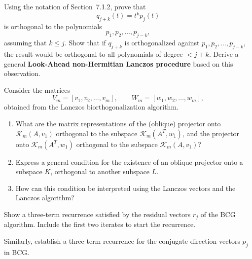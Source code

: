 \documentclass{ctexart}
\newif\ifpreface
\begin{document}
\large
\setlength{\baselineskip}{1.2em}
\ifpreface
    
\newgeometry{left=2cm,right=2cm,top=2cm,bottom=2cm}
\else
{}
\maketitle
\fi
\begin{problem}\label{pro:1}
Using the notation of Section~7.1.2, prove that 
\[
q_{j+k}(t) = t^{k} p_{j}(t)
\]
is orthogonal to the polynomials 
\[
p_1, p_2, \ldots, p_{j-k},
\]
assuming that \( k \leq j \). 
Show that if \( q_{j+k} \) is orthogonalized against 
\( p_1, p_2, \ldots, p_{j-k} \), 
the result would be orthogonal to all polynomials of degree 
\( < j + k \). 
Derive a general \textbf{Look-Ahead non-Hermitian Lanczos procedure} based on this observation.
\end{problem}
\begin{solution}
  
\end{solution}

\begin{problem}\label{pro:2}
Consider the matrices 
\[
V_m = [v_1, v_2, \ldots, v_m], \qquad 
W_m = [w_1, w_2, \ldots, w_m],
\]
obtained from the Lanczos biorthogonalization algorithm.
\begin{enumerate}
  \item What are the matrix representations of the (oblique) projector onto 
  \(\mathcal{K}_m(A, v_1)\)
  orthogonal to the subspace 
  \(\mathcal{K}_m(A^{T}, w_1)\),
  and the projector onto 
  \(\mathcal{K}_m(A^{T}, w_1)\)
  orthogonal to the subspace 
  \(\mathcal{K}_m(A, v_1)\)?
  
  \item Express a general condition for the existence of an oblique projector onto a subspace 
  \(K\),
  orthogonal to another subspace 
  \(L\).
  
  \item How can this condition be interpreted using the Lanczos vectors and the Lanczos algorithm?
\end{enumerate}
\end{problem}
\begin{solution}
  
\end{solution}

\begin{problem}\label{pro:3}
Show a three-term recurrence satisfied by the residual vectors \(r_j\) of the BCG algorithm. 
Include the first two iterates to start the recurrence. 

Similarly, establish a three-term recurrence for the conjugate direction vectors \(p_j\) in BCG.
\end{problem}
\begin{solution}
  
\end{solution}
\end{document}

